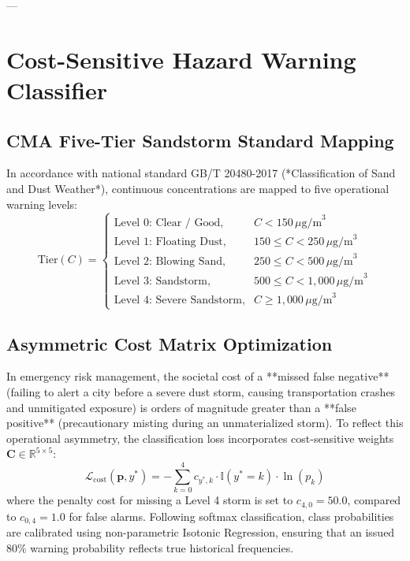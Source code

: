 ---

\section{Cost-Sensitive Hazard Warning Classifier}
\label{sec:hazard_classifier}

\subsection{CMA Five-Tier Sandstorm Standard Mapping}
\label{subsec:cma_mapping}

In accordance with national standard GB/T 20480-2017 (*Classification of Sand and Dust Weather*), continuous concentrations are mapped to five operational warning levels:
\begin{equation}
\label{eq:cma_classification}
\text{Tier}(C) = 
\begin{cases}
\text{Level 0: Clear / Good}, & C < 150\,\mu\text{g/m}^3 \\
\text{Level 1: Floating Dust}, & 150 \le C < 250\,\mu\text{g/m}^3 \\
\text{Level 2: Blowing Sand}, & 250 \le C < 500\,\mu\text{g/m}^3 \\
\text{Level 3: Sandstorm}, & 500 \le C < 1{,}000\,\mu\text{g/m}^3 \\
\text{Level 4: Severe Sandstorm}, & C \ge 1{,}000\,\mu\text{g/m}^3
\end{cases}
\end{equation}

\subsection{Asymmetric Cost Matrix Optimization}
\label{subsec:cost_matrix}

In emergency risk management, the societal cost of a **missed false negative** (failing to alert a city before a severe dust storm, causing transportation crashes and unmitigated exposure) is orders of magnitude greater than a **false positive** (precautionary misting during an unmaterialized storm). To reflect this operational asymmetry, the classification loss incorporates cost-sensitive weights $\mathbf{C} \in \mathbb{R}^{5 \times 5}$:
\begin{equation}
\label{eq:cost_sensitive_loss}
\mathcal{L}_{\text{cost}}(\mathbf{p}, y^*) = -\sum_{k=0}^4 c_{y^*, k} \cdot \mathbb{I}(y^* = k) \cdot \ln(p_k)
\end{equation}
where the penalty cost for missing a Level 4 storm is set to $c_{4, 0} = 50.0$, compared to $c_{0, 4} = 1.0$ for false alarms. Following softmax classification, class probabilities are calibrated using non-parametric Isotonic Regression, ensuring that an issued $80\%$ warning probability reflects true historical frequencies.

